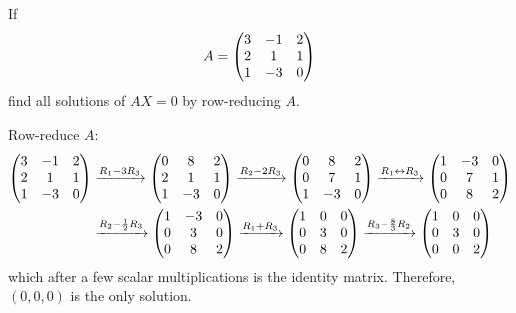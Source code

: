 \begin{xca}
  If \[ A = \mqty(3&-1&2 \\ 2&1&1 \\ 1&-3&0) \] find all solutions of $AX = 0$ by row-reducing $A$.
\end{xca}
\begin{sol}
  Row-reduce $A$:
  \begin{equation*}
    \begin{split}
      \mqty(3&-1&2 \\ 2&1&1 \\ 1&-3&0)
      & \xto{R_1 - 3R_3} \mqty(0&8&2 \\ 2&1&1 \\ 1&-3&0)
      \xto{R_2 - 2R_3} \mqty(0&8&2 \\ 0&7&1 \\ 1&-3&0)
      \xto{R_1 \harr R_3} \mqty(1&-3&0 \\ 0&7&1 \\ 0&8&2) \\
      & \xto{R_2 - \frac12 R_3} \mqty(1&-3&0 \\ 0&3&0 \\ 0&8&2)
      \xto{R_1 + R_3} \mqty(1&0&0 \\ 0&3&0 \\ 0&8&2)
      \xto{R_3 - \frac83 R_2} \mqty(1&0&0 \\ 0&3&0 \\ 0&0&2)
    \end{split}
  \end{equation*}
  which after a few scalar multiplications is the identity matrix.
  Therefore, $(0,0,0)$ is the only solution.
\end{sol}


